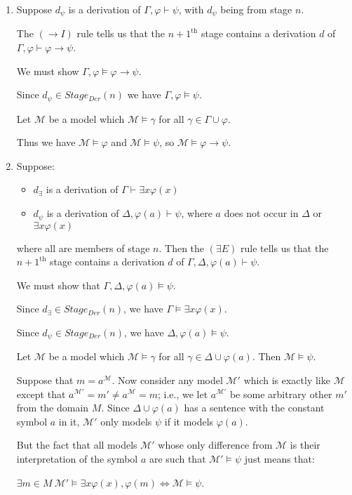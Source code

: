 \documentclass[a4paper]{article}
\newcommand{\MODEL}{\mathcal{M}}
\begin{document}
\begin{enumerate}
    \item Suppose $d_{\psi}$ is a derivation of $\Gamma, \varphi \vdash \psi$, with $d_{\psi}$ being from stage $n$.

    The $(\to I)$ rule tells us that the $n + 1^{\text{th}}$ stage contains a derivation $d$ of $\Gamma, \varphi \vdash \varphi \to \psi$.

    We must show $\Gamma, \varphi \models \varphi \to \psi$. 
    
    Since $d_{\psi} \in Stage_{Der}(n)$ we have $\Gamma, \varphi \models \psi$.

    Let $\MODEL$ be a model which $\MODEL \models \gamma$ for all $\gamma \in \Gamma \cup \varphi$.

    Thus we have $\MODEL \models \varphi$ and $\MODEL \models \psi$, so $\MODEL \models \varphi \to \psi$.

    \item Suppose:
        \begin{itemize}
            \item $d_{\exists}$ is a derivation of $\Gamma \vdash \exists x \varphi (x)$
            \item $d_{\psi}$ is a derivation of $\Delta, \varphi(a) \vdash \psi$, where $a$ does not occur in $\Delta$ or $\exists x \varphi (x)$
        \end{itemize}

        where all are members of stage $n$. Then the $(\exists E)$ rule tells us that the $n + 1^{\text{th}}$ stage contains a derivation $d$ of $\Gamma, \Delta, \varphi (a) \vdash \psi$.

        We must show that $\Gamma, \Delta, \varphi (a) \models \psi$.

        Since $d_{\exists} \in Stage_{Der}(n)$, we have $\Gamma\models \exists x \varphi (x)$.

        Since $d_{\psi} \in Stage_{Der}(n)$, we have $\Delta, \varphi (a) \models \psi$.


    Let $\MODEL$ be a model which $\MODEL \models \gamma$ for all $\gamma \in \Delta \cup \varphi (a)$.
        Then $\MODEL \models \psi$.


        Suppose that $m = a^{\MODEL}$. Now consider any model $\MODEL'$ which is exactly like $\MODEL$ except that $a^{\MODEL'} = m' \neq a^{\MODEL} = m$; i.e., we let $a^{\MODEL'}$ be some arbitrary other $m'$ from the domain $M$. Since $\Delta \cup \varphi (a)$ has a sentence with the constant symbol $a$ in it, $\MODEL'$ only models $\psi$ if it models  $\varphi (a)$.


        But the fact that all models $\MODEL'$ whose only difference from $\MODEL$ is their interpretation of the symbol $a$ are such that $\MODEL' \models \psi$ just means that:

        $\exists m \in M\ \MODEL' \models \exists x \varphi (x), \varphi (m)\Leftrightarrow \MODEL \models \psi$.

\end{enumerate}
\end{document}
